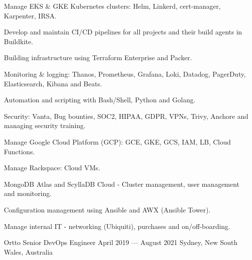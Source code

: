 \begin{cventries}
{\begin{cvitems}
      \item {Manage EKS \& GKE Kubernetes clusters: Helm, Linkerd, cert-manager, Karpenter, IRSA.}
      \item {Develop and maintain CI/CD pipelines for all projects and their build agents in Buildkite.}
      \item {Building infrastructure using Terraform Enterprise and Packer.}
      \item {Monitoring \& logging: Thanos, Prometheus, Grafana, Loki, Datadog, PagerDuty, Elasticsearch, Kibana and Beats.}
      \item {Automation and scripting with Bash/Shell, Python and Golang.}
      \item {Security: Vanta, Bug bounties, SOC2, HIPAA, GDPR, VPNs, Trivy, Anchore and managing security training.}
      \item {Manage Google Cloud Platform (GCP): GCE, GKE, GCS, IAM, LB, Cloud Functions.}
      \item {Manage Rackspace: Cloud VMs.}
      \item {MongoDB Atlas and ScyllaDB Cloud - Cluster management, user management and monitoring.}
      \item {Configuration management using Ansible and AWX (Ansible Tower).}
      \item {Manage internal IT - networking (Ubiquiti), purchases and on/off-boarding.}
    \end{cvitems}
  }

  \cventry
  {Ortto} %
  {Senior DevOps Engineer} %
  {April 2019 --- August 2021} %
  {Sydney, New South Wales, Australia} %
  {} %
  {} %
  {} %


\end{cventries}
